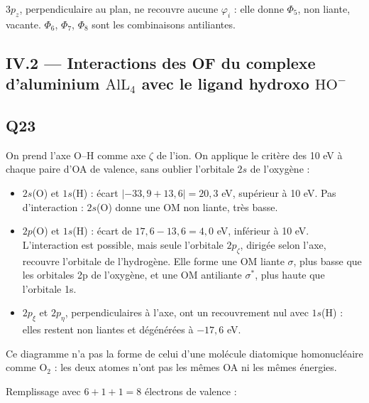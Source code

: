 \documentclass[11pt,a4paper]{article}
\providecommand{\tightlist}{\setlength{\itemsep}{0pt}\setlength{\parskip}{0pt}}
\begin{document}
\(3p_z\), perpendiculaire au plan, ne recouvre aucune \(\varphi_i\) : elle donne \(\Phi_5\), non liante, vacante. \(\Phi_6\), \(\Phi_7\), \(\Phi_8\) sont les combinaisons antiliantes.

\hypertarget{iv.2-interactions-des-of-du-complexe-daluminium-mathrmall_4-avec-le-ligand-hydroxo-mathrmho-}{%
\subsection{\texorpdfstring{IV.2 --- Interactions des OF du complexe d'aluminium \(\mathrm{AlL_4}\) avec le ligand hydroxo \(\mathrm{HO^-}\)}{IV.2 --- Interactions des OF du complexe d'aluminium \textbackslash mathrm\{AlL\_4\} avec le ligand hydroxo \textbackslash mathrm\{HO\^{}-\}}}\label{iv.2-interactions-des-of-du-complexe-daluminium-mathrmall_4-avec-le-ligand-hydroxo-mathrmho-}}

\hypertarget{q23}{%
\subsection{Q23}\label{q23}}

On prend l'axe O--H comme axe \(\zeta\) de l'ion. On applique le critère des 10 eV à chaque paire d'OA de valence, sans oublier l'orbitale \(2s\) de l'oxygène :

\begin{itemize}
\tightlist
\item
  \(2s\)(O) et \(1s\)(H) : écart \(|-33{,}9+13{,}6|=20{,}3\) eV, supérieur à 10 eV. Pas d'interaction : \(2s\)(O) donne une OM non liante, très basse.
\item
  \(2p\)(O) et \(1s\)(H) : écart de \(17{,}6-13{,}6=4{,}0\) eV, inférieur à 10 eV. L'interaction est possible, mais seule l'orbitale \(2p_\zeta\), dirigée selon l'axe, recouvre l'orbitale de l'hydrogène. Elle forme une OM liante \(\sigma\), plus basse que les orbitales 2p de l'oxygène, et une OM antiliante \(\sigma^*\), plus haute que l'orbitale 1s.
\item
  \(2p_\xi\) et \(2p_\eta\), perpendiculaires à l'axe, ont un recouvrement nul avec \(1s\)(H) : elles restent non liantes et dégénérées à \(-17{,}6\) eV.
\end{itemize}

Ce diagramme n'a pas la forme de celui d'une molécule diatomique homonucléaire comme \(\mathrm{O_2}\) : les deux atomes n'ont pas les mêmes OA ni les mêmes énergies.

Remplissage avec \(6+1+1=8\) électrons de valence :
\end{document}
